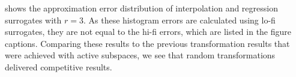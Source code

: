 \documentclass[
  a4paper,  %
  twoside,  %
  bibliography=totoc,
  headsepline,
  cleardoublepage=empty,
  parskip=half,
  draft=false
]{scrbook}
\begin{document}
\begin{mdframed}[style=style]
\begin{figure}[H]
\begin{subfigure}[H]{.5\textwidth}
\vspace{3mm}
  \label{fig:ishigami_hist_3}
\end{subfigure}
\delimit
\label{fig:ishigami_hist_3_both}
\end{figure}
\end{mdframed}
%
 shows the approximation error distribution of interpolation and regression surrogates with $r=3$.
As these histogram errors are calculated using lo-fi surrogates, they are not equal to the hi-fi errors, which are listed in the figure captions.
Comparing these results to the previous transformation results that were achieved with active subspaces, we see that random transformations delivered competitive results.
\end{document}
